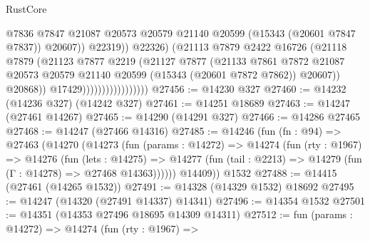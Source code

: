 \begin{lexlean}{RustCore}
\begin{coremodule}
                                              @7836
                                              @7847
                                              @21087
                                              @20573
                                              @20579
                                              @21140
                                              @20599
                                              (@15343 (@20601 @7847 @7837))
                                              @20607))
                                          @22319))
                                      @22326)
                                    (@21113
                                      @7879
                                      @2422
                                      @16726
                                      (@21118
                                        @7879
                                        (@21123
                                          @7877
                                          @2219
                                          (@21127
                                            @7877
                                            (@21133
                                              @7861
                                              @7872
                                              @21087
                                              @20573
                                              @20579
                                              @21140
                                              @20599
                                              (@15343 (@20601 @7872 @7862))
                                              @20607))
                                          @20868))
                                      @17429)))))))))))))))))
@27456 := @14230 @327
@27460 := @14232 (@14236 @327) (@14242 @327)
@27461 := @14251 @18689
@27463 := @14247 (@27461 @14267)
@27465 := @14290 (@14291 @327)
@27466 := @14286 @27465
@27468 := @14247 (@27466 @14316)
@27485 := @14246
    (fun (fn : @94) =>
    @27463
      (@14270
        (@14273
          (fun (params : @14272) =>
          @14274
            (fun (rty : @1967) =>
            @14276
              (fun (lets : @14275) =>
              @14277 (fun (tail : @2213) => @14279 (fun (Γ : @14278) => @27468 @14363))))))
        @14409))
    @1532
@27488 := @14415 (@27461 (@14265 @1532))
@27491 := @14328 (@14329 @1532) @18692
@27495 := @14247 (@14320 (@27491 @14337) @14341)
@27496 := @14354 @1532
@27501 := @14351 (@14353 @27496 @18695 @14309 @14311)
@27512 := fun (params : @14272) =>
  @14274
    (fun (rty : @1967) =>

\end{coremodule}
\end{lexlean}
